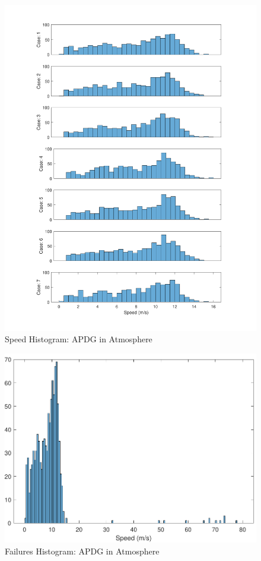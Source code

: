 \begin{figure}[H]
	\centering
	\begin{minipage}{4.3 in}
		\includegraphics[width=\linewidth]{Figures/hspddisppowatmo.pdf}
		\caption{Speed Histogram: APDG in Atmosphere \label{fig:hspddisppowatmo} }
	\end{minipage}
\end{figure}



\begin{figure}[H]
	\centering
	\begin{minipage}{4.3 in}
		\includegraphics[width=\linewidth]{Figures/hspdfaildisppowatmo.pdf}
		\caption{Failures Histogram: APDG in Atmosphere \label{fig:hspdfaildisppowatmo} }
	\end{minipage}
\end{figure}

